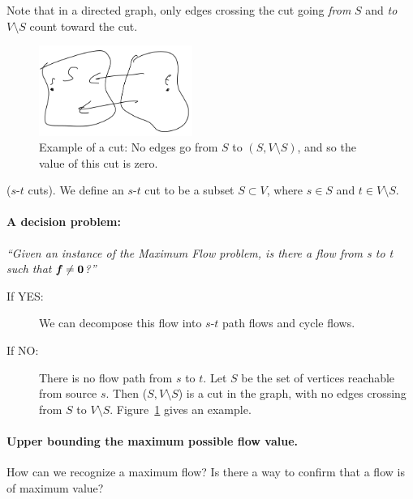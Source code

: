 Note that in a directed graph, only edges crossing the cut
going \emph{from} $S$ and \emph{to} $V\setminus S$ count toward the cut.

\begin{figure}[H]
 \centering
 \includegraphics[width=50mm,scale=0.1]{fig/fig2_lec10.PNG}
 \caption{Example of a cut: No edges go from $S$ to $(S, V\setminus
   S)$, and so the value of this cut is zero.}
  \label{fig:cutnoforwardedges}
\end{figure}

\begin{definition*}
  ($s$-$t$ cuts). We define an $s$-$t$ cut to be a subset $S \subset
  V$, where $s \in S$ and $t \in V \setminus S$.


\end{definition*}

\paragraph{A decision problem:}
\emph{``Given an instance of the Maximum Flow  problem, is there a flow from s to t such that \(\boldsymbol{\mathit{f}} \neq \boldsymbol{0}\)?''}

\begin{description}
\item[If YES:] We can decompose this flow into $s$-$t$ path flows and
  cycle flows.
\item[If NO:]  There is no flow path from $s$ to $t$. Let $S$ be the
  set of vertices reachable from source $s$. Then (\(S,V \setminus
  S\)) is a cut in the graph, with no edges crossing from $S$ to \( V
  \setminus S\). Figure~\ref{fig:cutnoforwardedges} gives an example.
\end{description}

\paragraph{Upper bounding the maximum possible flow value.}
How can we recognize a maximum flow? Is there a way to confirm that a
flow is of maximum value?

